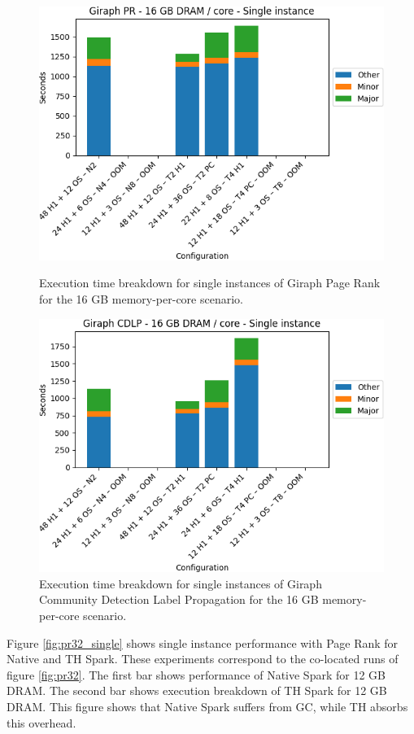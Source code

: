 \begin{figure}[thbp]
        \centering
    \includegraphics[width=\linewidth]{./fig/g_pr128_single.png}
    \caption{Execution time breakdown for single instances of Giraph
    Page Rank for the 16 GB memory-per-core scenario.}
    \label{fig:g_pr128_single}
    \includegraphics[width=\linewidth]{./fig/g_cdlp128_single.png}
    \caption{Execution time breakdown for single instances of Giraph
    Community Detection Label Propagation for the 16 GB memory-per-core scenario.}
    \label{fig:g_cdlp128_single}
\end{figure}

Figure \ref{fig:pr32_single} shows single instance performance with Page Rank for Native and TH Spark. These experiments correspond to the co-located runs of figure \ref{fig:pr32}. The first bar shows performance of Native Spark for 12 GB DRAM. The second bar shows execution breakdown of TH Spark for 12 GB DRAM. This figure shows that Native Spark suffers from GC, while TH absorbs this overhead.

